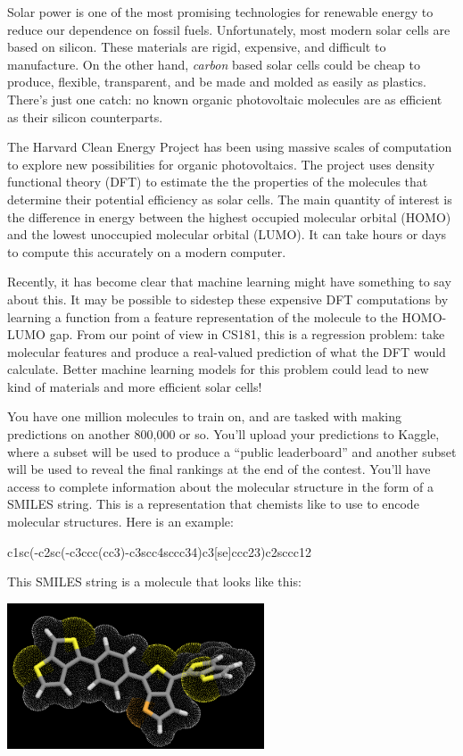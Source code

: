 \documentclass[12pt]{article}
\begin{document}
	Solar power is one of the most promising technologies for renewable energy to reduce our dependence on fossil fuels.  Unfortunately, most modern solar cells are based on silicon.  These materials are rigid, expensive, and difficult to manufacture.  On the other hand, \emph{carbon} based solar cells could be cheap to produce, flexible, transparent, and be made and molded as easily as plastics.  There's just one catch: no known organic photovoltaic molecules are as efficient as their silicon counterparts.
	
	The Harvard Clean Energy Project has been using massive scales of computation to explore new possibilities for organic photovoltaics.  The project uses density functional theory (DFT) to estimate the the properties of the molecules that determine their potential efficiency as solar cells.  The main quantity of interest is the difference in energy between the highest occupied molecular orbital (HOMO) and the lowest unoccupied molecular orbital (LUMO).  It can take hours or days to compute this accurately on a modern computer.
	
	Recently, it has become clear that machine learning might have something to say about this.  It may be possible to sidestep these expensive DFT computations by learning a function from a feature representation of the molecule to the HOMO-LUMO gap.  From our point of view in CS181, this is a regression problem: take molecular features and produce a real-valued prediction of what the DFT would calculate.  Better machine learning models for this problem could lead to new kind of materials and more efficient solar cells!
	
	You have one million molecules to train on, and are tasked with making predictions on another 800,000 or so.  You'll upload your predictions to Kaggle, where a subset will be used to produce a ``public leaderboard'' and another subset will be used to reveal the final rankings at the end of the contest.  You'll have access to complete information about the molecular structure in the form of a SMILES string.  This is a representation that chemists like to use to encode molecular structures.  Here is an example:
	\begin{center}
		c1sc(-c2sc(-c3ccc(cc3)-c3scc4sccc34)c3[se]ccc23)c2sccc12
	\end{center}
	This SMILES string is a molecule that looks like this:
	\begin{center}
		\includegraphics[width=3in]{molecule}
	\end{center}
	
\end{document}
